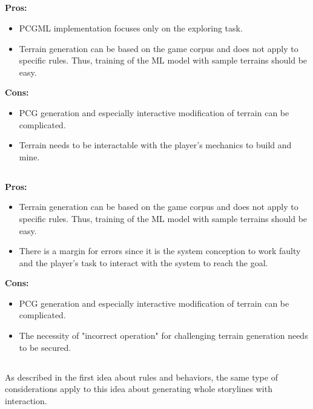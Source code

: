 \documentclass[MGS,Master,english]{twbook}%
\begin{document}
\subsection{}
\textbf{Pros:}
\begin{itemize}
	\item PCGML implementation focuses only on the exploring task.
	\item Terrain generation can be based on the game corpus and does not apply to specific rules. Thus, training of the ML model with sample terrains should be easy.
\end{itemize}
\textbf{Cons:}
\begin{itemize}
	\item PCG generation and especially interactive modification of terrain can be complicated.
	\item Terrain needs to be interactable with the player's mechanics to build and mine.
\end{itemize}

\subsection{}
\textbf{Pros:}
\begin{itemize}
	\item Terrain generation can be based on the game corpus and does not apply to specific rules. Thus, training of the ML model with sample terrains should be easy.
	\item There is a margin for errors since it is the system conception to work faulty and the player's task to interact with the system to reach the goal. 
\end{itemize}
\textbf{Cons:}
\begin{itemize}
	\item PCG generation and especially interactive modification of terrain can be complicated.
	\item The necessity of "incorrect operation" for challenging terrain generation needs to be secured.
\end{itemize}

\subsection{}
As described in the first idea about rules and behaviors, the same type of considerations apply to this idea about generating whole storylines with interaction.
\end{document}
